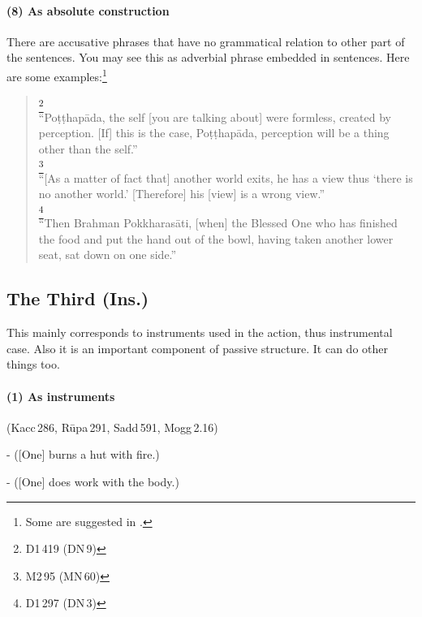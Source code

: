 \paragraph*{(8) As absolute construction} There are accusative phrases that have no grammatical relation to other part of the sentences. You may see this as adverbial phrase embedded in sentences. Here are some examples:\footnote{Some are suggested in \citealp[p.~315]{perniola:grammar}.}
\begin{quote}
\footnote{D1\,419 (DN\,9)}\\
``Po\d t\d thap\=ada, the self [you are talking about] were formless, created by perception. [If] this is the case, Po\d t\d thap\=ada, perception will be a thing other than the self.''\\[1.5mm]
\footnote{M2\,95 (MN\,60)}\\
``[As a matter of fact that] another world exits, he has a view thus `there is no another world.' [Therefore] his [view] is a wrong view.''\\[1.5mm]
\footnote{D1\,297 (DN\,3)}\\
``Then Brahman Pokkharas\=ati, [when] the Blessed One who has finished the food and put the hand out of the bowl, having taken another lower seat, sat down on one side.''\\[1.5mm]
\end{quote}

{}
\subsection*{The Third  (Ins.)}

This  mainly corresponds to instruments used in the action, thus instrumental case. Also it is an important component of passive structure. It can do other things too.

\paragraph*{(1) As instruments} (Kacc\,286, R\=upa\,291, Sadd\,591, Mogg\,2.16)\par
-  ([One] burns a hut with fire.)\par
-  ([One] does work with the body.)\par


